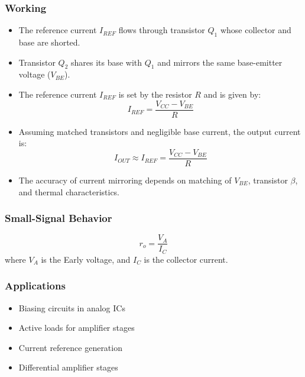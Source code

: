 \documentclass[conference]{IEEEtran}
\begin{document}
\subsubsection{Working}
\begin{itemize}
    \item The reference current $I_{REF}$ flows through transistor $Q_1$ whose collector and base are shorted.
    \item Transistor $Q_2$ shares its base with $Q_1$ and mirrors the same base-emitter voltage ($V_{BE}$).
    \item The reference current $I_{REF}$ is set by the resistor $R$ and is given by:
    \begin{equation}
    I_{REF} = \frac{V_{CC} - V_{BE}}{R}
    \end{equation}
    \item Assuming matched transistors and negligible base current, the output current is:
    \begin{equation}
    I_{OUT} \approx I_{REF} = \frac{V_{CC} - V_{BE}}{R}
    \end{equation}
    \item The accuracy of current mirroring depends on matching of $V_{BE}$, transistor $\beta$, and thermal characteristics.
\end{itemize}

\subsubsection{Small-Signal Behavior}
\begin{equation}
r_o = \frac{V_A}{I_C}
\end{equation}
where $V_A$ is the Early voltage, and $I_C$ is the collector current.

\subsubsection{Applications}
\begin{itemize}
    \item Biasing circuits in analog ICs
    \item Active loads for amplifier stages
    \item Current reference generation
    \item Differential amplifier stages
\end{itemize}
\end{document}
